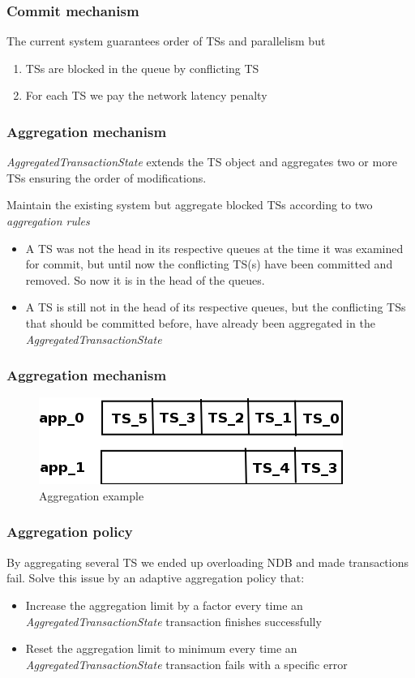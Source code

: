 \documentclass{beamer}
\begin{document}
\begin{frame}
\frametitle{Commit mechanism}

The current system guarantees order of TSs and parallelism but

\begin{enumerate}
\item TSs are blocked in the queue by conflicting TS
\item For each TS we pay the network latency penalty
\end{enumerate}
\end{frame}

\begin{frame}
\frametitle{Aggregation mechanism}
\emph{AggregatedTransactionState} extends the TS object and aggregates
two or more TSs ensuring the order of modifications.

Maintain the existing system but aggregate blocked TSs according to
two \emph{aggregation rules}

\begin{itemize}
\item<+-> A TS was not the head in its respective queues at the time
  it was examined for commit, but until now the conflicting TS(s) have
  been committed and removed. So now it is in the head of the queues.

\item<+-> A TS is still not in the head of its respective queues, but
  the conflicting TSs that should be committed before, have already
  been aggregated in the \emph{AggregatedTransactionState}
\end{itemize}
\end{frame}

\begin{frame}
\frametitle{Aggregation mechanism}

\begin{figure}
\centering
\includegraphics[scale=0.5]{resources/commit_system_aggr_example.png}
\caption{Aggregation example}
\end{figure}
\end{frame}

\begin{frame}
\frametitle{Aggregation policy}
By aggregating several TS we ended up overloading NDB and made
transactions fail. Solve this issue by an adaptive aggregation policy
that:

\begin{itemize}
\item Increase the aggregation limit by a factor every time an
  \emph{AggregatedTransactionState} transaction finishes successfully
\item Reset the aggregation limit to minimum every time an
  \emph{AggregatedTransactionState} transaction fails with a specific error
\end{itemize}

\end{frame}
\end{document}
